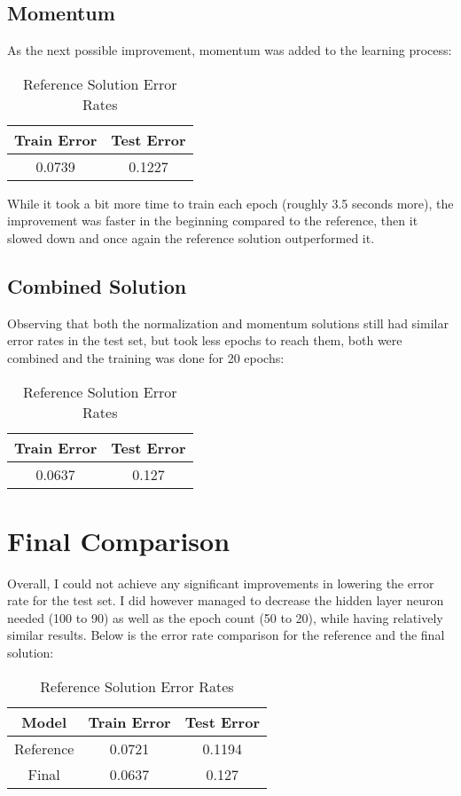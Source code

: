 \documentclass[
  a4paper,            %
  DIV=10,             %
  oneside,            %
  BCOR=5mm,           %
  parskip=half,       %
  numbers=noenddot,   %
  bibtotoc,           %
  listof=totoc,        %
  article
]{scrreprt}
\begin{document}
\subsection{Momentum}
As the next possible improvement, momentum was added to the learning process:
\begin{table}[h!]
  \centering
  \begin{tabular}{|c|c|}
  \hline
  \textbf{Train Error} & \textbf{Test Error} \\
  \hline
  0.0739 & 0.1227 \\
  \hline
  \end{tabular}
  \caption*{Reference Solution Error Rates}
  \end{table}
While it took a bit more time to train each epoch (roughly 3.5 seconds more), the improvement was faster in the beginning compared to the reference, then it slowed down and once again the reference solution outperformed it.
\subsection{Combined Solution}
Observing that both the normalization and momentum solutions still had similar error rates in the test set, but took less epochs to reach them, both were combined and the training was done for 20 epochs:
\begin{table}[h!]
  \centering
  \begin{tabular}{|c|c|}
  \hline
  \textbf{Train Error} & \textbf{Test Error} \\
  \hline
  0.0637 & 0.127 \\
  \hline
  \end{tabular}
  \caption*{Reference Solution Error Rates}
  \end{table}
\section{Final Comparison}
Overall, I could not achieve any significant improvements in lowering the error rate for the test set.
I did however managed to decrease the hidden layer neuron needed (100 to 90) as well as the epoch count (50 to 20), while having relatively similar results.
Below is the error rate comparison for the reference and the final solution:
\begin{table}[h!]
  \centering
  \begin{tabular}{|c|c|c|}
  \hline
  \textbf{Model} & \textbf{Train Error} & \textbf{Test Error} \\
  \hline
  Reference & 0.0721 & 0.1194 \\
  \hline
  Final & 0.0637 & 0.127 \\
  \hline
  \end{tabular}
  \caption*{Reference Solution Error Rates}
  \end{table}
\end{document}
